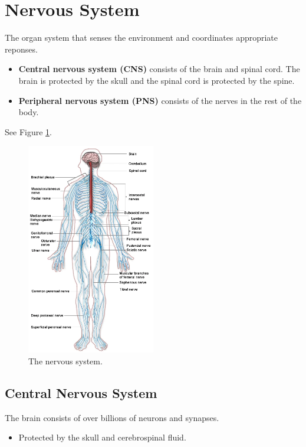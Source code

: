 \documentclass[12pt]{report}
\begin{document}
\section{Nervous System}
\begin{definition}
    The organ system that senses the environment and coordinates appropriate reponses. 
    \begin{itemize}
        \item{ \textbf{Central nervous system (CNS)} consists of the brain and spinal cord. The brain is protected by the skull and the spinal cord is protected by the spine.}
        \item{ \textbf{Peripheral nervous system (PNS)} consists of the nerves in the rest of the body.}
    \end{itemize}
    See Figure \ref{fig:nervous-system}.
\end{definition}

\begin{figure}[H]
\centering
    \includegraphics[width= 0.5\textwidth]{../figures/nervous system.png}
    \caption{The nervous system.}
    \label{fig:nervous-system}
\end{figure}

\subsection{Central Nervous System}
\begin{definition}
    The brain consists of over billions of neurons and synapses. 
    \begin{itemize}
        \item{Protected by the skull and cerebrospinal fluid.}
    \end{itemize}
\end{definition}
\end{document}
